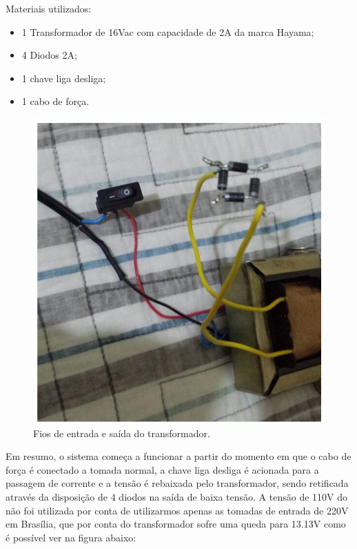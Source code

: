 Materiais utilizados:
\begin{itemize}
\item 1 Transformador de 16Vac com capacidade de 2A da marca Hayama;
\item 4 Diodos 2A;
\item 1 chave liga desliga;
\item 1 cabo de força.
\end{itemize}

 \begin{figure}[H]
	\centering
	\includegraphics[scale=0.5]{figuras/fiosiotransformador}
	\caption{Fios de entrada e saída do transformador.}
	\label{img:fiosiotransformador}
\end{figure}

Em resumo, o sistema começa a funcionar a partir  do momento em que o cabo de força é conectado a tomada normal, a chave liga desliga é acionada para a passagem de corrente e a tensão é rebaixada pelo transformador, sendo retificada através da disposição de 4 diodos na saída de baixa tensão.
A tensão de 110V do não foi utilizada por conta de utilizarmos apenas as tomadas de entrada de 220V em Brasília, que por conta do transformador sofre uma queda para 13.13V como é possível ver na figura abaixo: 

